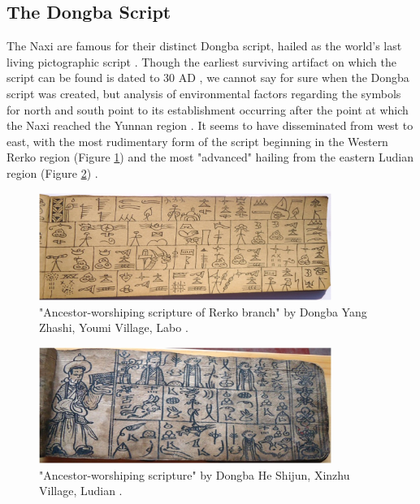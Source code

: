 \documentclass[11pt,a4paper,oneside]{report}
\begin{document}
\subsection{The Dongba Script}
\noindent\hspace{1cm}
The Naxi are famous for their distinct Dongba script, hailed as the world's last living pictographic script \cite{nishida_living_1966}. Though the earliest surviving artifact on which the script can be found is dated to 30 AD \cite{kleo_treasures_nodate}, we cannot say for sure when the Dongba script was created, but analysis of environmental factors regarding the symbols for north and south point to its establishment occurring after the point at which the Naxi reached the Yunnan region \cite{li_dictionary_1944, zhang_tibetan-yi_2022}. It seems to have disseminated from west to east, with the most rudimentary form of the script beginning in the Western Rerko region (Figure \ref{fig:rerko}) and the most "advanced" hailing from the eastern Ludian region (Figure \ref{fig:ludian}) \cite{wang_developments_2001}. 

\begin{figure}[H] 
    \centering
    \includegraphics[width=0.85\textwidth]{Images/rerko_manu.jpeg}
    \caption[Dongba Manuscript from Rerko Region]{"Ancestor-worshiping scripture of Rerko branch" by Dongba Yang Zhashi, Youmi Village, Labo \cite{yang_study_2024}.}
    \label{fig:rerko}
\end{figure}

\begin{figure}[H] 
    \centering
    \includegraphics[width=0.85\textwidth]{Images/ludian_manu.jpg}
    \caption[Dongba Manuscript from Ludian Region]{"Ancestor-worshiping scripture" by Dongba He Shijun, Xinzhu Village, Ludian \cite{yang_study_2024}.}
    \label{fig:ludian}
\end{figure}
\end{document}

